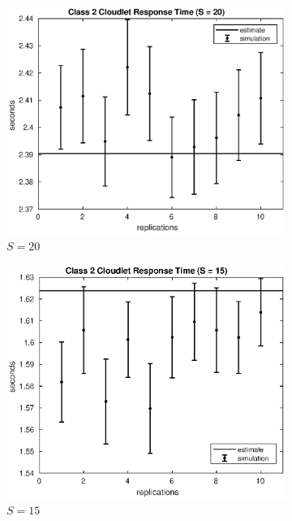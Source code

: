 \begin{figure}[!h]
\centering
%
\begin{subfigure}[t]{0.49\textwidth}
\includegraphics[width=\textwidth]{figures/simul/20_500K_s2clet}
\caption{$S = 20$}
\label{20_s2clet}
\end{subfigure}
%
\begin{subfigure}[t]{0.49\textwidth}
\includegraphics[width=\textwidth]{figures/simul/15_500K_s2clet}
\caption{$S = 15$}
\label{15_s2clet}
\end{subfigure}
%
\begin{subfigure}[t]{0.49\textwidth}

\end{subfigure}
\end{figure}
